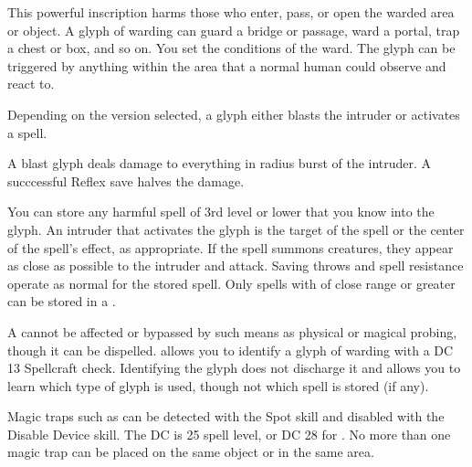 \spellschool{Abjuration (Warding) [Trap}
\begin{spelleffect}
\par This powerful inscription harms those who enter, pass, or open the warded area or object. A glyph of warding can guard a bridge or passage, ward a portal, trap a chest or box, and so on. You set the conditions of the ward. The glyph can be triggered by anything within the area that a normal human could observe and react to.
\par Depending on the version selected, a glyph either blasts the intruder or activates a spell.
\par {} A blast glyph deals damage to everything in \areasmall radius burst of the intruder. A succcessful Reflex save halves the damage.
\par {} You can store any harmful spell of 3rd level or lower that you know into the glyph. An intruder that activates the glyph is the target of the spell or the center of the spell's effect, as appropriate. If the spell summons creatures, they appear as close as possible to the intruder and attack. Saving throws and spell resistance operate as normal for the stored spell. Only spells with of close range or greater can be stored in a .
\end{spelleffect}
\begin{spellnotes}
\par A  cannot be affected or bypassed by such means as physical or magical probing, though it can be dispelled.  allows you to identify a glyph of warding with a DC 13 Spellcraft check. Identifying the glyph does not discharge it and allows you to learn which type of glyph is used, though not which spell is stored (if any).
\par Magic traps such as  can be detected with the Spot skill and disabled with the Disable Device skill. The DC is 25 \add spell level, or DC 28 for . No more than one magic trap can be placed on the same object or in the same area.
\end{spellnotes}

